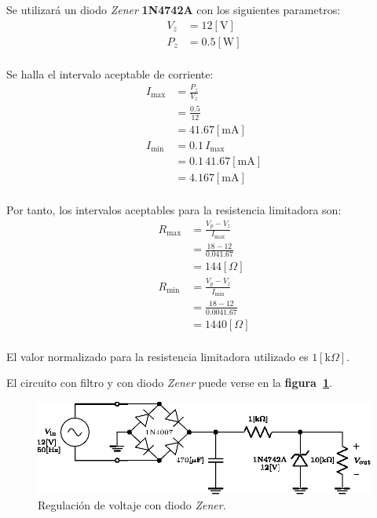 Se utilizará un diodo \emph{Zener} \textbf{1N4742A} con los siguientes
parametros:
\begin{equation*}
    \begin{split}
        V_z &= 12[\text{V}]\\
        P_z &= 0.5[\text{W}]\\
    \end{split}
\end{equation*}

Se halla el intervalo aceptable de corriente:
\begin{equation*}
    \begin{split}
        I_{\text{max}} &= \frac{P_z}{V_z}\\
                       &= \frac{0.5}{12}\\
                       &= 41.67[\text{mA}]\\
        I_{\text{min}} &= 0.1\,I_{\text{max}}\\
                       &= 0.1\,41.67[\text{mA}]\\
                       &= 4.167[\text{mA}]\\
    \end{split}
\end{equation*}

Por tanto, los intervalos aceptables para la resistencia limitadora son:
\begin{equation*}
    \begin{split}
        R_{\text{max}} &= \frac{V_p - V_z}{I_{\text{max}}}\\
                       &= \frac{18 - 12}{0.041.67}\\
                       &= 144[\Omega]\\
        R_{\text{min}} &= \frac{V_p - V_z}{I_{\text{min}}}\\
                       &= \frac{18 - 12}{0.0041.67}\\
                       &= 1440[\Omega]\\
    \end{split}
\end{equation*}

El valor normalizado para la resistencia limitadora utilizado es
$1[\text{k}\Omega]$.

El circuito con filtro y con diodo \emph{Zener} puede verse en la
\textbf{figura~\ref{circuito08}}.

\begin{figure}[!h]
\centering
\includegraphics[scale=1.20]{diagramas/08.zener1.eps}
\caption{Regulación de voltaje con diodo \emph{Zener}.}
\label{circuito08}
\end{figure}

